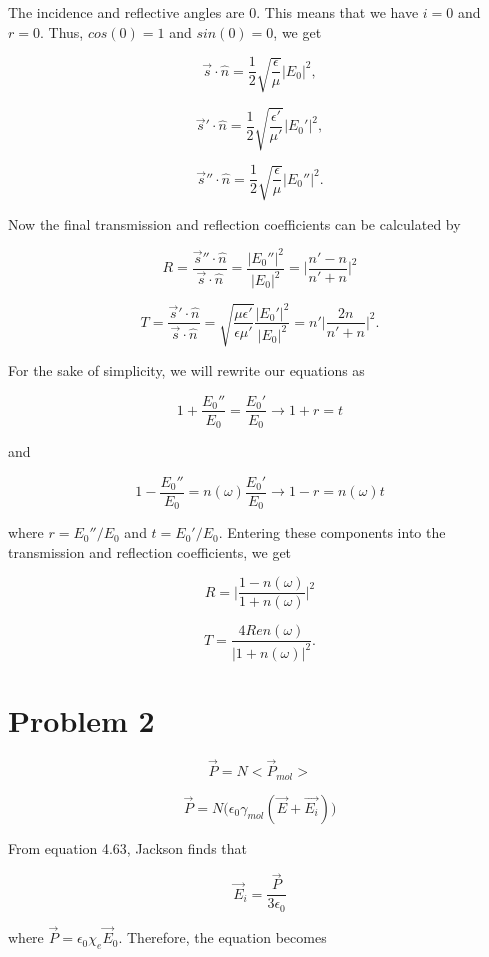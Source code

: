 \documentclass[11pt]{article}
\begin{document}
The incidence and reflective angles are $0$. This means that we have $i = 0$ and $r = 0$. Thus, $cos(0) = 1$ and $sin(0) = 0$, we get

$$
\vec{s} \cdot \hat{n} = \frac{1}{2}\sqrt{\frac{\epsilon}{\mu}}|E_{0}|^{2},
$$

$$
\vec{s}' \cdot \hat{n} = \frac{1}{2}\sqrt{\frac{\epsilon'}{\mu'}}|E_{0}'|^{2},
$$

$$
\vec{s}'' \cdot \hat{n} = \frac{1}{2}\sqrt{\frac{\epsilon}{\mu}}|E_{0}''|^{2}.
$$

Now the final transmission and reflection coefficients can be calculated by

$$
R = \frac{\vec{s}'' \cdot \hat{n}}{\vec{s} \cdot \hat{n}} = \frac{|E_{0}''|^{2}}{|E_{0}|^{2}} = \Bigg|\frac{n' - n}{n' + n}\Bigg|^{2}
$$

$$
T = \frac{\vec{s}' \cdot \hat{n}}{\vec{s} \cdot \hat{n}} = \sqrt{\frac{\mu \epsilon'}{\epsilon \mu'}} \frac{|E_{0}'|^{2}}{|E_{0}|^{2}} = n'\Bigg|\frac{2n}{n' + n}\Bigg|^{2}.
$$

For the sake of simplicity, we will rewrite our equations as

$$
1 + \frac{E_{0}''}{E_{0}} = \frac{E_{0}'}{E_{0}} \rightarrow 1 + r = t
$$

and

$$
1 - \frac{E_{0}''}{E_{0}} = n(\omega)\frac{E_{0}'}{E_{0}} \rightarrow 1 - r = n(\omega)t
$$

where $r = E_{0}''/E_{0}$ and $t = E_{0}'/E_{0}$. Entering these components into the transmission and reflection coefficients, we get

$$
R = \Bigg|\frac{1 - n(\omega)}{1 + n(\omega)}\Bigg|^{2}
$$

$$
T = \frac{4Re n(\omega)}{|1 + n(\omega)|^{2}}.
$$

\clearpage

\section*{Problem 2}

$$
\vec{P} = N\big<\vec{P}_{mol}\big>
$$

$$
\vec{P} = N\big(\epsilon_{0}\gamma_{mol}(\vec{E} + \vec{E_{i}})\Big)
$$

From equation 4.63, Jackson finds that 

$$
\vec{E}_{i} = \frac{\vec{P}}{3\epsilon_{0}}
$$

where $\vec{P} = \epsilon_{0} \chi_{e} \vec{E}_{0}$. Therefore, the equation becomes 
\end{document}
